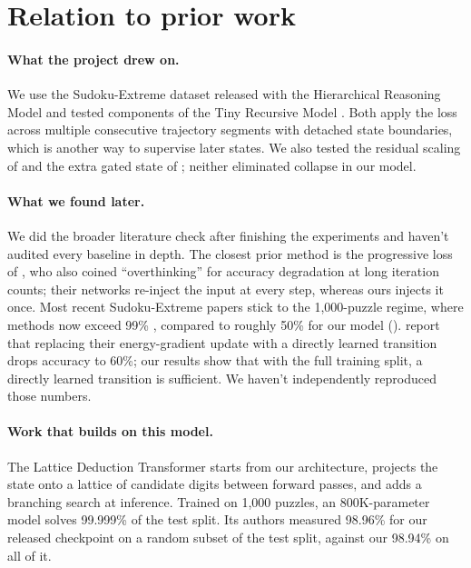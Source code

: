 \section{Relation to prior work}
\label{sec:related}

\paragraph{What the project drew on.} We use the Sudoku-Extreme dataset released with the Hierarchical Reasoning Model \citep{wang2025hierarchical} and tested components of the Tiny Recursive Model \citep{jolicoeur2025less}. Both apply the loss across multiple consecutive trajectory segments with detached state boundaries, which is another way to supervise later states. We also tested the residual scaling of \citet{wang2026loopmup} and the extra gated state of \citet{zeitoun2026hyperloop}; neither eliminated collapse in our model.

\paragraph{What we found later.} We did the broader literature check after finishing the experiments and haven't audited every baseline in depth. The closest prior method is the progressive loss of \citet{bansal2022end}, who also coined ``overthinking'' for accuracy degradation at long iteration counts; their networks re-inject the input at every step, whereas ours injects it once. Most recent Sudoku-Extreme papers stick to the 1,000-puzzle regime, where methods now exceed 99\% \citep{huang2026eqr,chen2026ebr}, compared to roughly 50\% for our model (). \citet{chen2026ebr} report that replacing their energy-gradient update with a directly learned transition drops accuracy to 60\%; our results show that with the full training split, a directly learned transition is sufficient. We haven't independently reproduced those numbers.

\paragraph{Work that builds on this model.} The Lattice Deduction Transformer \citep{davis2026lattice} starts from our architecture, projects the state onto a lattice of candidate digits between forward passes, and adds a branching search at inference. Trained on 1,000 puzzles, an 800K-parameter model solves 99.999\% of the test split. Its authors measured 98.96\% for our released checkpoint on a random subset of the test split, against our 98.94\% on all of it.
